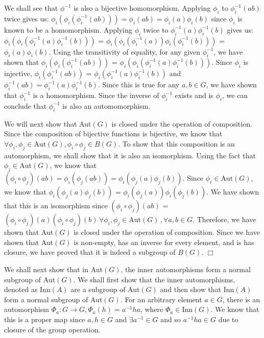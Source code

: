 \documentclass[12pt,letterpaper,reqno]{amsart}
\begin{document}
\begin{enumerate}
\begin{flushleft}
We shall see that $\phi^{-1}$ is also a bijective homomorphism. Applying $\phi_i$ to $\phi_i^{-1}(ab)$ twice gives us: $\phi_i(\phi_i(\phi_i^{-1}(ab))) = \phi_i(ab) = \phi_i(a)\phi_i(b)$ since $\phi_i$ is known to be a homomorphism. Applying $\phi_i$ twice to $\phi_i^{-1}(a)\phi_i^{-1}(b)$ gives us: $\phi_i(\phi_i(\phi_i^{-1}(a)\phi_i^{-1}(b)))$ = $\phi_i(\phi_i(\phi_i^{-1}(a))\phi_i(\phi_i^{-1}(b)))$ = $\phi_i(a)\phi_i(b)$. Using the transitivity of equality, for any given $\phi_i^{-1}$, we have shown that $\phi_i(\phi_i(\phi_i^{-1}(ab)))$ = $\phi_i(\phi_i(\phi_i^{-1}(a)\phi_i^{-1}(b)))$. Since $\phi_i$ is injective, $\phi_i(\phi_i^{-1}(ab))$ = $\phi_i(\phi_i^{-1}(a)\phi_i^{-1}(b))$ and $\phi_i^{-1}(ab) = \phi_i^{-1}(a)\phi_i^{-1}(b)$. Since this is true for any $a, b \in G$, we have shown that $\phi_i^{-1}$ is a homomorphism. Since the inverse of $\phi_i^{-1}$ exists and is $\phi_i$, we can conclude that $\phi_i^{-1}$ is also an automomorphism.
\newline

We will next show that Aut$(G)$ is closed under the operation of composition. Since the composition of bijective functions is bijective, we know that $\forall \phi_i, \phi_j \in \text{Aut}(G), \phi_i \circ \phi_j \in B(G)$. To show that this composition is an automorphism, we shall show that it is also an isomorphism. Using the fact that $\phi_j \in \text{Aut}(G)$, we know that $(\phi_i \circ \phi_j)(ab) = \phi_i(\phi_j(ab)) = \phi_i(\phi_j(a)\phi_j(b))$. Since $\phi_i \in \text{Aut}(G)$, we know that $\phi_i(\phi_j(a)\phi_j(b))$ = $\phi_i(\phi_j(a))\phi_i(\phi_j(b))$. We have shown that this is an isomorphism since $(\phi_i \circ \phi_j)(ab)$ = $(\phi_i \circ \phi_j)(a)(\phi_i \circ \phi_j)(b)\, \forall \phi_i, \phi_j \in \text{Aut}(G)\,, \forall a, b \in G$. Therefore, we have shown that Aut$(G)$ is closed under the operation of composition. Since we have shown that Aut$(G)$ is non-empty, has an inverse for every element, and is has closure, we have proved that it is indeed a subgroup of $B(G)$. $\Box$
\newline

We shall next show that in Aut$(G)$, the inner automorphisms form a normal subgroup of Aut$(G)$. We shall first show that the inner automorphisms, denoted as Inn$(A)$ are a subgroup of Aut$(G)$ and then show that Inn$(A)$ form a normal subgroup of Aut$(G)$. For an arbitrary element $a \in G$, there is an automorphism $\Phi_a: G \rightarrow G, \Phi_a(h) = a^{-1}ha$, where $\Phi_a \in \text{Inn}(G)$. We know that this is a proper map since $a, h \in G$ and $\exists a^{-1} \in G$ and so $a^{-1}ha \in G$ due to closure of the group operation.
\newline


\end{flushleft}
\end{enumerate}
\end{document}
